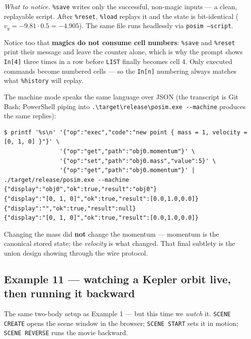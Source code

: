 \documentclass[11pt]{article}
\newcommand{\kw}[1]{\texttt{\uppercase{#1}}}
\newcommand{\code}[1]{\texttt{#1}}
\begin{document}
\emph{What to notice.} \code{\%save} writes only the successful,
non-magic inputs --- a clean, replayable script. After \code{\%reset},
\code{\%load} replays it and the state is bit-identical
($v_y = -9.81\cdot0.5 = -4.905$). The same file runs headlessly via
\code{posim --script}.

Notice too that \textbf{magics do not consume cell numbers}:
\code{\%save} and \code{\%reset} print their message and leave the
counter alone, which is why the prompt shows \code{In[4]} three times
in a row before \kw{list} finally becomes cell 4. Only executed
commands become numbered cells --- so the \code{In[n]} numbering always
matches what \code{\%history} will replay.

The machine mode speaks the same language over JSON (the transcript is
Git Bash; PowerShell piping into
\code{.\textbackslash{}target\textbackslash{}release\textbackslash{}posim.exe -{}-machine}
produces the same replies):

\begin{lstlisting}
$ printf '%s\n' '{"op":"exec","code":"new point { mass = 1, velocity = [0, 1, 0] }"}' \
                '{"op":"get","path":"obj0.momentum"}' \
                '{"op":"set","path":"obj0.mass","value":5}' \
                '{"op":"get","path":"obj0.momentum"}' | ./target/release/posim.exe --machine
{"display":"obj0","ok":true,"result":"obj0"}
{"display":"[0, 1, 0]","ok":true,"result":[0.0,1.0,0.0]}
{"display":"","ok":true,"result":null}
{"display":"[0, 1, 0]","ok":true,"result":[0.0,1.0,0.0]}
\end{lstlisting}

Changing the mass did \textbf{not} change the momentum --- momentum is
the canonical stored state; the \emph{velocity} is what changed. That
final subtlety is the union design showing through the wire protocol.

\subsection{Example 11 --- watching a Kepler orbit live, then running it backward}

The same two-body setup as Example 1 --- but this time we \emph{watch}
it. \kw{scene create} opens the scene window in the browser;
\kw{scene start} sets it in motion; \kw{scene reverse} runs the movie
backward.
\end{document}
